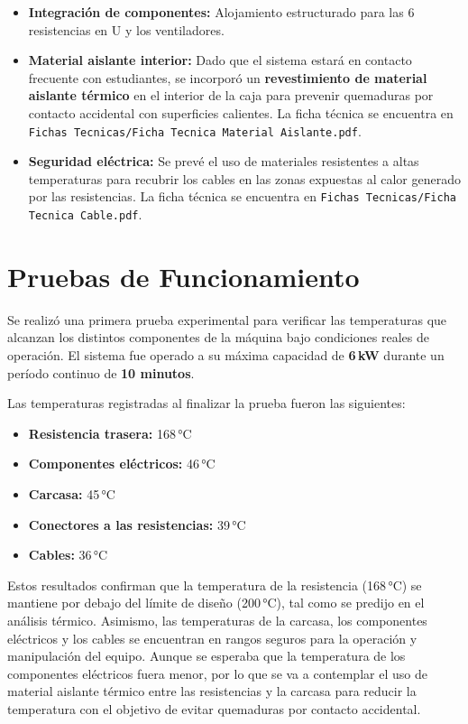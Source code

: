 \documentclass[12pt, a4paper]{article}
\begin{document}
\begin{itemize}
    \item \textbf{Integración de componentes:} Alojamiento estructurado para las 6 resistencias
    en U y los ventiladores.

    \item \textbf{Material aislante interior:} Dado que el sistema estará en contacto frecuente
    con estudiantes, se incorporó un \textbf{revestimiento de material aislante térmico} en el
    interior de la caja para prevenir quemaduras por contacto accidental con superficies
    calientes. La ficha técnica se encuentra en \texttt{Fichas Tecnicas/Ficha Tecnica Material
    Aislante.pdf}.

    \item \textbf{Seguridad eléctrica:} Se prevé el uso de materiales resistentes a altas
    temperaturas para recubrir los cables en las zonas expuestas al calor generado por las
    resistencias. La ficha técnica se encuentra en \texttt{Fichas Tecnicas/Ficha Tecnica
    Cable.pdf}.
\end{itemize}

\section{Pruebas de Funcionamiento}

Se realizó una primera prueba experimental para verificar las temperaturas que alcanzan los distintos componentes de la máquina bajo condiciones reales de operación. El sistema fue operado a su máxima capacidad de \textbf{6\,kW} durante un período continuo de \textbf{10 minutos}. 

Las temperaturas registradas al finalizar la prueba fueron las siguientes:

\begin{itemize}
    \item \textbf{Resistencia trasera:} 168\,°C
    \item \textbf{Componentes eléctricos:} 46\,°C
    \item \textbf{Carcasa:} 45\,°C
    \item \textbf{Conectores a las resistencias:} 39\,°C
    \item \textbf{Cables:} 36\,°C
\end{itemize}

Estos resultados confirman que la temperatura de la resistencia (168\,°C) se mantiene por debajo del límite de diseño (200\,°C), tal como se predijo en el análisis térmico. Asimismo, las temperaturas de la carcasa, los componentes eléctricos y los cables se encuentran en rangos seguros para la operación y manipulación del equipo. Aunque se esperaba que la temperatura de los componentes eléctricos fuera menor, por lo que se va a contemplar el uso de material aislante térmico entre las resistencias y la carcasa para reducir la temperatura con el objetivo de evitar quemaduras por contacto accidental.
\end{document}
